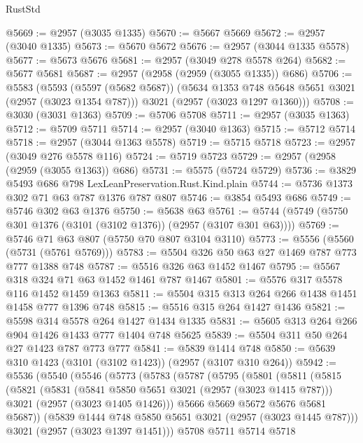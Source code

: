 \begin{lexlean}{RustStd}
\begin{coremodule}
@5669 := @2957 (@3035 @1335)
@5670 := @5667 @5669
@5672 := @2957 (@3040 @1335)
@5673 := @5670 @5672
@5676 := @2957 (@3044 @1335 @5578)
@5677 := @5673 @5676
@5681 := @2957 (@3049 @278 @5578 @264)
@5682 := @5677 @5681
@5687 := @2957 (@2958 (@2959 (@3055 @1335)) @686)
@5706 := @5583
    (@5593
      (@5597 (@5682 @5687))
      (@5634 @1353 @748 @5648 @5651 @3021 (@2957 (@3023 @1354 @787)))
      @3021
      (@2957 (@3023 @1297 @1360)))
@5708 := @3030 (@3031 @1363)
@5709 := @5706 @5708
@5711 := @2957 (@3035 @1363)
@5712 := @5709 @5711
@5714 := @2957 (@3040 @1363)
@5715 := @5712 @5714
@5718 := @2957 (@3044 @1363 @5578)
@5719 := @5715 @5718
@5723 := @2957 (@3049 @276 @5578 @116)
@5724 := @5719 @5723
@5729 := @2957 (@2958 (@2959 (@3055 @1363)) @686)
@5731 := @5575 (@5724 @5729)
@5736 := @3829 @5493 @686 @798 LexLeanPreservation.Rust.Kind.plain
@5744 := @5736 @1373 @302 @71 @63 @787 @1376 @787 @807
@5746 := @3854 @5493 @686
@5749 := @5746 @302 @63 @1376
@5750 := @5638 @63
@5761 := @5744 (@5749 (@5750 @301 @1376 (@3101 (@3102 @1376)) (@2957 (@3107 @301 @63))))
@5769 := @5746 @71 @63 @807 (@5750 @70 @807 @3104 @3110)
@5773 := @5556 (@5560 (@5731 (@5761 @5769)))
@5783 := @5504 @326 @50 @63 @27 @1469 @787 @773 @777 @1388 @748
@5787 := @5516 @326 @63 @1452 @1467
@5795 := @5567 @318 @324 @71 @63 @1452 @1461 @787 @1467
@5801 := @5576 @317 @5578 @116 @1452 @1459 @1363
@5811 := @5504 @315 @313 @264 @266 @1438 @1451 @1458 @777 @1396 @748
@5815 := @5516 @315 @264 @1427 @1436
@5821 := @5598 @314 @5578 @264 @1427 @1434 @1335
@5831 := @5605 @313 @264 @266 @904 @1426 @1433 @777 @1404 @748 @5625
@5839 := @5504 @311 @50 @264 @27 @1423 @787 @773 @777
@5841 := @5839 @1414 @748
@5850 := @5639 @310 @1423 (@3101 (@3102 @1423)) (@2957 (@3107 @310 @264))
@5942 := @5536
    (@5540
      (@5546
        (@5773
          (@5783
            (@5787
              (@5795
                (@5801
                  (@5811
                    (@5815
                      (@5821
                        (@5831
                          (@5841 @5850 @5651 @3021 (@2957 (@3023 @1415 @787)))
                          @3021
                          (@2957 (@3023 @1405 @1426)))
                        @5666
                        @5669
                        @5672
                        @5676
                        @5681
                        @5687))
                    (@5839 @1444 @748 @5850 @5651 @3021 (@2957 (@3023 @1445 @787)))
                    @3021
                    (@2957 (@3023 @1397 @1451)))
                  @5708
                  @5711
                  @5714
                  @5718

\end{coremodule}
\end{lexlean}
